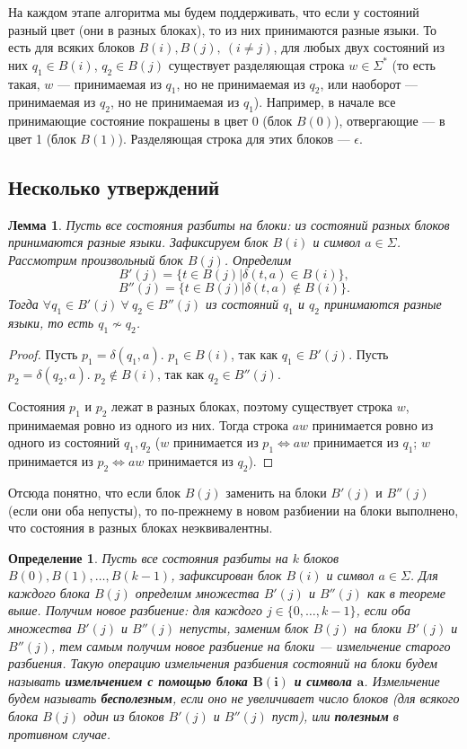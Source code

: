 \documentclass{article}
\newtheorem{lemma}{Лемма}
\newtheorem{definition}{Определение}%
\begin{document}
На каждом этапе алгоритма мы будем поддерживать, что если у состояний разный цвет (они в разных блоках), то из них принимаются разные языки. То есть для всяких блоков $B(i), B(j), \ (i \neq j)$, для любых двух состояний из них $q_1 \in B(i)$, $q_2 \in B(j)$ существует разделяющая строка $w \in \Sigma^*$ (то есть такая, $w$  --- принимаемая из $q_1$, но не принимаемая из $q_2$, или наоборот --- принимаемая из $q_2$, но не принимаемая из $q_1$). Например, в начале все принимающие состояние покрашены в цвет 0 (блок $B(0)$), отвергающие --- в цвет 1 (блок $B(1)$). Разделяющая строка для этих блоков --- $\epsilon$.

\subsection{Несколько утверждений}
\begin{lemma} Пусть все состояния разбиты на блоки: из состояний разных блоков принимаются разные языки. Зафиксируем блок $B(i)$ и символ $a \in \Sigma$. Рассмотрим произвольный блок $B(j)$. Определим \[B'(j) = \{ t \in B(j) | \delta(t, a) \in B(i)\},\]
\[B''(j) = \{ t \in B(j) | \delta(t, a) \notin B(i)\}.\]
Тогда $\forall q_1 \in B'(j) \ \forall \ q_2 \in B''(j)$ из состояний $q_1$ и $q_2$ принимаются разные языки, то есть $q_1 \not \sim q_2$.
\end{lemma}
\begin{proof}
Пусть $p_1 = \delta(q_1, a)$. $p_1 \in B(i)$, так как $q_1 \in B'(j)$. Пусть $p_2 = \delta(q_2, a)$. $p_2 \not \in B(i)$, так как $q_2 \in B''(j)$.

Состояния $p_1$ и $p_2$ лежат в разных блоках, поэтому существует строка $w$, принимаемая ровно из одного из них. Тогда строка $aw$ принимается ровно из одного из состояний $q_1, q_2$ ($w$ принимается из $p_1 \Longleftrightarrow aw$  принимается из $q_1$; $w$ принимается из $p_2 \Longleftrightarrow aw$  принимается из $q_2$).
\end{proof}
Отсюда понятно, что если блок $B(j)$ заменить на блоки $B'(j)$ и $B''(j)$ (если они оба непусты), то по-прежнему в новом разбиении на блоки выполнено, что состояния в разных блоках неэквивалентны.
\begin{definition}
    Пусть все состояния разбиты на $k$ блоков $B(0), B(1), \dots, B(k - 1)$, зафиксирован блок $B(i)$ и символ $a \in \Sigma$. Для каждого блока $B(j)$ определим множества $B'(j)$ и $B''(j)$ как в теореме выше. Получим новое разбиение: для каждого $j \in \{0, \dots, k - 1\}$, если оба множества $B'(j)$ и $B''(j)$ непусты, заменим блок $B(j)$ на блоки $B'(j)$ и $B''(j)$, тем самым получим новое разбиение  на блоки --- измельчение старого разбиения. Такую операцию измельчения разбиения состояний на блоки будем называть \textbf{измельчением с помощью блока $\textbf{B}(\textbf{i})$ и символа $\textbf{a}$}. Измельчение будем называть \textbf{бесполезным}, если оно не увеличивает число блоков (для всякого блока $B(j)$ один из блоков $B'(j)$ и $B''(j)$ пуст), или \textbf{полезным} в противном случае.
\end{definition}
\end{document}
